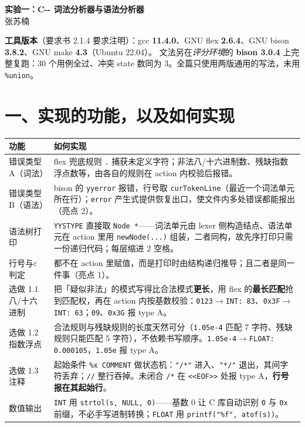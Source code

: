 \documentclass[11pt,a4paper]{ctexart}
\newcommand{\code}[1]{\texttt{#1}}
\begin{document}
\begin{center}
{\large\bfseries 实验一：C{-}{-} 词法分析器与语法分析器}\\[4pt]
张苏楠
\end{center}

\vspace{2pt}
\textbf{工具版本}（要求书 2.1.4 要求注明）：gcc \textbf{11.4.0}、GNU flex
\textbf{2.6.4}、GNU bison \textbf{3.8.2}、GNU make \textbf{4.3}（Ubuntu 22.04）。
文法另在\emph{评分环境}的 \textbf{bison 3.0.4} 上完整复跑：30 个用例全过、冲突
state 数同为 3。全篇只使用两版通用的写法，未用 \code{\%union}。

\section*{一、实现的功能，以及如何实现}

{\small
\begin{tabular}{@{}p{2.9cm}p{13.9cm}@{}}
\toprule
\textbf{功能} & \textbf{如何实现} \\
\midrule
错误类型 A（词法） & flex 兜底规则 \code{.} 捕获未定义字符；非法八/十六进制数、残缺指数浮点数等，由各自的规则在 action 内校验后报错。 \\
错误类型 B（语法） & bison 的 \code{yyerror} 报错，行号取 \code{curTokenLine}（最近一个词法单元所在行）；\code{error} 产生式提供恢复出口，使文件内多处错误都能报出（亮点 2）。 \\
语法树打印 & \code{YYSTYPE} 直接取 \code{Node *}——词法单元由 lexer 侧构造结点、语法单元在 action 里用 \code{newNode(...)} 组装，二者同构，故先序打印只需一份递归代码；每层缩进 2 空格。 \\
行号与\newline $\varepsilon$ 判定 & 都不在 action 里赋值，而是打印时由结构递归推导；且二者是同一件事（亮点 1）。 \\
选做 1.1\newline 八/十六进制 & 把「疑似非法」的模式写得比合法模式\textbf{更长}，用 flex 的\textbf{最长匹配}抢到匹配权，再在 action 内按基数校验：\code{0123}$\to$\code{INT: 83}、\code{0x3F}$\to$\code{INT: 63}；\code{09}、\code{0x3G} 报 type A。 \\
选做 1.2\newline 指数浮点 & 合法规则与残缺规则的长度天然可分（\code{1.05e-4} 匹配 7 字符、残缺规则只能匹配 5 字符），不依赖书写顺序。\code{1.05e-4}$\to$\code{FLOAT: 0.000105}，\code{1.05e} 报 type A。 \\
选做 1.3\newline 注释 & 起始条件 \code{\%x COMMENT} 做状态机：\code{"/*"} 进入、\code{"*/"} 退出，其间字符丢弃；\code{//} 整行吞掉。未闭合 \code{/*} 在 \code{<<EOF>>} 处报 type A，\textbf{行号报在其起始行}。 \\
数值输出 & \code{INT} 用 \code{strtol(s, NULL, 0)}——基数 0 让 C 库自动识别 \code{0} 与 \code{0x} 前缀，不必手写进制转换；\code{FLOAT} 用 \code{printf("\%f", atof(s))}。 \\
\bottomrule
\end{tabular}}
\end{document}
